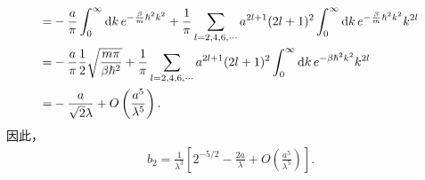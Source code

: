 \documentclass{assignment}
\begin{document}
\begin{sol}
\begin{itemize}
\begin{align}
            \notag=&-\frac{a}{\pi}\int_0^{\infty}\mathrm{d}k\,e^{-\frac{\beta}{m}\hbar^2k^2}+\frac{1}{\pi}\sum_{l=2,4,6,\cdots}a^{2l+1}(2l+1)^2\int_0^{\infty}\mathrm{d}k\,e^{-\frac{\beta}{m}\hbar^2k^2}k^{2l}\\
            \notag=&-\frac{a}{\pi}\frac{1}{2}\sqrt{\frac{m\pi}{\beta\hbar^2}}+\frac{1}{\pi}\sum_{l=2,4,6,\cdots}a^{2l+1}(2l+1)^2\int_0^{\infty}\mathrm{d}k\,e^{-\beta\hbar^2k^2}k^{2l}\\
            =&-\frac{a}{\sqrt{2}\lambda}+O\left(\frac{a^5}{\lambda^5}\right).
        \end{align}
        因此，
        \begin{align}
            b_2=\frac{1}{\lambda^3}\left[2^{-5/2}-\frac{2a}{\lambda}+O\left(\frac{a^5}{\lambda^5}\right)\right].
        \end{align}
    \end{itemize}
\end{sol}
\end{document}
